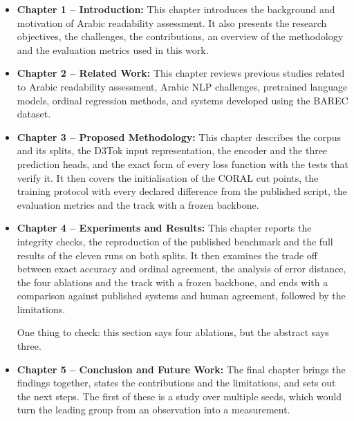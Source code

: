 \documentclass[12pt]{report}
\begin{document}
\begin{itemize}

\item \textbf{Chapter 1 -- Introduction:}
This chapter introduces the background and motivation of Arabic readability assessment. It also presents the research objectives, the challenges, the contributions, an overview of the methodology and the evaluation metrics used in this work.

\vspace{0.2cm}

\item \textbf{Chapter 2 -- Related Work:}
This chapter reviews previous studies related to Arabic readability assessment, Arabic NLP challenges, pretrained language models, ordinal regression methods, and systems developed using the BAREC dataset.

\vspace{0.2cm}

\item \textbf{Chapter 3 -- Proposed Methodology:}
This chapter describes the corpus and its splits, the D3Tok input representation, the encoder and the three prediction heads, and the exact form of every loss function with the tests that verify it. It then covers the initialisation of the CORAL cut points, the training protocol with every declared difference from the published script, the evaluation metrics and the track with a frozen backbone.
\vspace{0.2cm}

\item \textbf{Chapter 4 -- Experiments and Results:}
This chapter reports the integrity checks, the reproduction of the published benchmark and the full results of the eleven runs on both splits. It then examines the trade off between exact accuracy and ordinal agreement, the analysis of error distance, the four ablations and the track with a frozen backbone, and ends with a comparison against published systems and human agreement, followed by the limitations.

One thing to check: this section says four ablations, but the abstract says three.
\vspace{0.2cm}

\item \textbf{Chapter 5 -- Conclusion and Future Work:}
The final chapter brings the findings together, states the contributions and the limitations, and sets out the next steps. The first of these is a study over multiple seeds, which would turn the leading group from an observation into a measurement.
\end{itemize}
\end{document}
